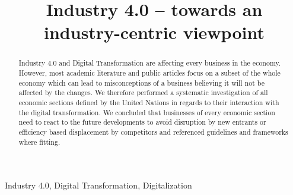 


\title{Industry 4.0 – towards an industry-centric viewpoint}

\author{
	\and
}

\maketitle
\thispagestyle{plain}
\pagestyle{plain}


\begin{abstract}%
Industry 4.0 and Digital Transformation are affecting every business in the economy. However, most academic literature and public articles focus on a subset of the whole economy which can lead to misconceptions of a business believing it will not be affected by the changes. We therefore performed a systematic investigation of all economic sections defined by the United Nations in regards to their interaction with the digital transformation. We concluded that businesses of every economic section need to react to the future developments to avoid disruption by new entrants or efficiency based displacement by competitors and referenced guidelines and frameworks where fitting. 
\end{abstract}

\begin{IEEEkeywords}
Industry 4.0, Digital Transformation, Digitalization
\end{IEEEkeywords}








\begingroup
\def\UrlBreaks{\do\/\do-}


\endgroup



